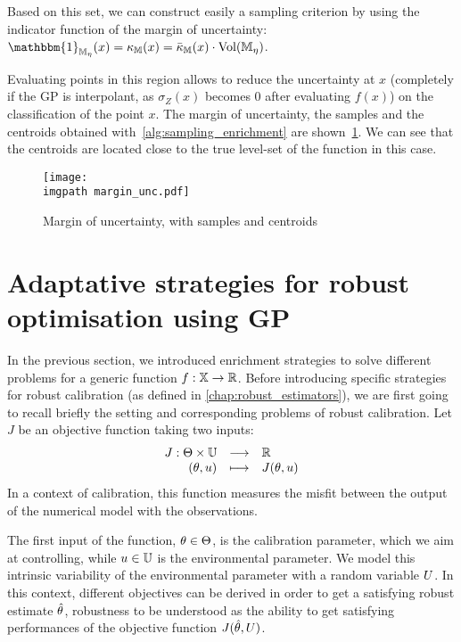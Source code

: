 \documentclass[../../Main_ManuscritThese.tex]{subfiles}
\newcommand\imgpath{/home/victor/acadwriting/Manuscrit/Text/Chapter4/img/}
\begin{document}
Based on this set, we can construct easily a sampling criterion by using the indicator function of the margin of uncertainty: $\mathbbm{1}_{\mathbb{M}_{\eta}}(x)=\kappa_{\mathbb{M}}(x) = \bar{\kappa}_{\mathbb{M}}(x) \cdot \mathrm{Vol}(\mathbb{M}_{\eta})$.

Evaluating points in this region allows to reduce the uncertainty at $x$ (completely if the GP is interpolant, as $\sigma_Z(x)$ becomes $0$ after evaluating $f(x)$) on the classification of the point $x$.
The margin of uncertainty, the samples and the centroids obtained with~\cref{alg:sampling_enrichment} are shown~\cref{fig:margin_unc}. We can see that the centroids are located close to the true level-set of the function in this case.

\begin{figure}[ht]
  \centering
  \texttt{[image: \\imgpath margin\_unc.pdf]}
  \caption{\label{fig:margin_unc} Margin of uncertainty, with samples and centroids}
\end{figure}

\clearpage
\section{Adaptative strategies for robust optimisation using GP}
\label{sec:robust_criteria_gp}
In the previous section, we introduced enrichment strategies to solve different problems for a generic function $f:\mathbb{X}\rightarrow \mathbb{R}$.
Before introducing specific strategies for robust calibration (as defined in \cref{chap:robust_estimators}), we are first going to recall briefly the setting and corresponding problems of robust calibration.
Let $J$ be an objective function taking two inputs:
\begin{equation}
  \begin{array}{rcl}
    J: \Theta \times \mathbb{U}& \longrightarrow& \mathbb{R} \\
    (\theta, u) & \longmapsto & J(\theta, u)
  \end{array}
\end{equation}
In a context of calibration, this function measures the misfit between the output of the numerical model with the observations.

The first input of the function, $\theta\in\Theta$, is the calibration parameter, which we aim at controlling, while $u\in\mathbb{U}$ is the environmental parameter. We model this intrinsic variability of the environmental parameter with a random variable $U$.
In this context, different objectives can be derived in order to get a satisfying robust estimate $\hat{\theta}$, robustness to be understood as the ability to get satisfying performances of the objective function $J(\hat{\theta},U)$.
\end{document}
